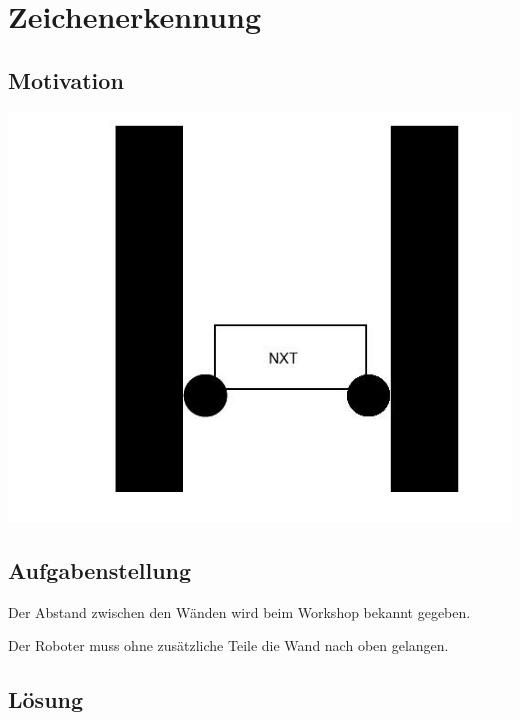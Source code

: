 \chapter{Zeichenerkennung}
\section{Motivation}


\begin{capfigure}[Kletterroboter]
	\includegraphics[width=\textwidth]{images/klettern_skizze}
\end{capfigure}

\section{Aufgabenstellung}
Der Abstand zwischen den Wänden wird beim Workshop bekannt gegeben.

Der Roboter muss ohne zusätzliche Teile die Wand nach oben gelangen.
\section{Lösung}